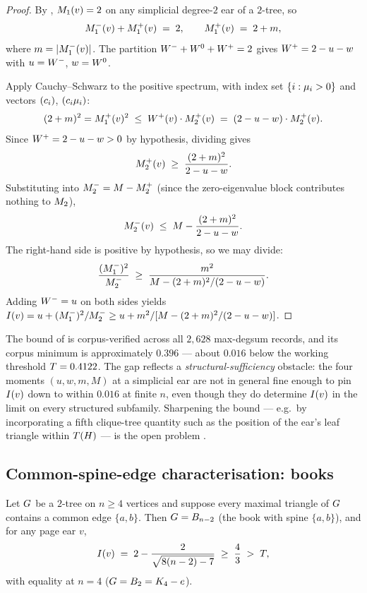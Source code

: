 \begin{proof}
By , $M_{1}(v) = 2$ on any simplicial degree-$2$
ear of a $2$-tree, so
\[
M_{1}^{-}(v) + M_{1}^{+}(v) \;=\; 2,
\qquad
M_{1}^{+}(v) \;=\; 2 + m,
\]
where $m = |M_{1}^{-}(v)|$. The partition $W^{-} + W^{0} + W^{+} = 2$ gives
$W^{+} = 2 - u - w$ with $u = W^{-}$, $w = W^{0}$.

Apply Cauchy--Schwarz to the positive spectrum, with index set
$\{i : \mu_{i} > 0\}$ and vectors $(c_{i})$, $(c_{i} \mu_{i})$:
\[
(2 + m)^{2} = M_{1}^{+}(v)^{2} \;\le\; W^{+}(v) \cdot M_{2}^{+}(v)
\;=\; (2 - u - w) \cdot M_{2}^{+}(v).
\]
Since $W^{+} = 2 - u - w > 0$ by hypothesis, dividing gives
\[
M_{2}^{+}(v) \;\ge\; \frac{(2 + m)^{2}}{2 - u - w}.
\]
Substituting into $M_{2}^{-} = M - M_{2}^{+}$ (since the zero-eigenvalue
block contributes nothing to $M_{2}$),
\[
M_{2}^{-}(v) \;\le\; M - \frac{(2 + m)^{2}}{2 - u - w}.
\]
The right-hand side is positive by hypothesis, so we may divide:
\[
\frac{(M_{1}^{-})^{2}}{M_{2}^{-}} \;\ge\; \frac{m^{2}}{M - (2 + m)^{2}/(2 - u - w)}.
\]
Adding $W^{-} = u$ on both sides yields
$I(v) = u + (M_{1}^{-})^{2}/M_{2}^{-} \ge u + m^{2}/[M - (2 + m)^{2}/(2 - u - w)]$.
\end{proof}

\begin{remark}\label{rem:cs-two-sided-gap}
The bound of  is corpus-verified across all
$2{,}628$ max-degsum records, and its corpus minimum is approximately
$0.396$ — about $0.016$ below the working threshold
$T = 0.4122$. The gap reflects a \emph{structural-sufficiency}
obstacle: the four moments $(u, w, m, M)$ at a simplicial ear are not
in general fine enough to pin $I(v)$ down to within $0.016$ at finite
$n$, even though they do determine $I(v)$ in the limit on every
structured subfamily. Sharpening the bound — e.g.\ by incorporating a
fifth clique-tree quantity such as the position of the ear's leaf
triangle within $T(H)$ — is the open problem
.
\end{remark}

\subsection{Common-spine-edge characterisation: books}\label{sec:moment-form:common-edge}

\begin{proposition}\label{prop:common-edge-books}
Let $G$ be a $2$-tree on $n \ge 4$ vertices and suppose every
maximal triangle of $G$ contains a common edge $\{a, b\}$. Then
$G = B_{n-2}$ (the book with spine $\{a, b\}$), and for any page
ear $v$,
\[
I(v) \;=\; 2 - \frac{2}{\sqrt{8(n-2) - 7}} \;\ge\; \frac{4}{3} \;>\; T,
\]
with equality at $n = 4$ ($G = B_{2} = K_{4} - e$).
\end{proposition}

